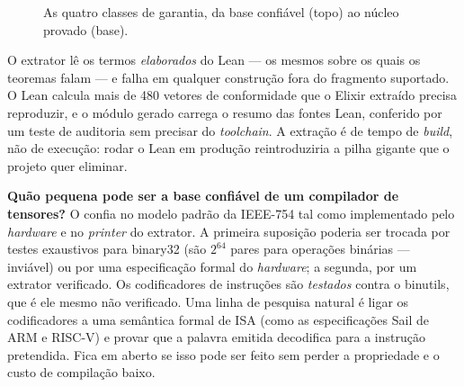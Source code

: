 \begin{figure}[htbp]
\centering
{}
\caption{As quatro classes de garantia, da base confiável (topo) ao núcleo provado (base).}
\label{fig:garantias}
\end{figure}

O extrator lê os termos \emph{elaborados} do Lean --- os mesmos sobre os quais os teoremas falam --- e falha em qualquer construção fora do fragmento suportado. O Lean calcula mais de 480 vetores de conformidade que o Elixir extraído precisa reproduzir, e o módulo gerado carrega o resumo das fontes Lean, conferido por um teste de auditoria sem precisar do \textit{toolchain}. A extração é de tempo de \textit{build}, não de execução: rodar o Lean em produção reintroduziria a pilha gigante que o projeto quer eliminar.

\begin{doutorado}
\textbf{Quão pequena pode ser a base confiável de um compilador de tensores?} O \vapor{} confia no modelo padrão da IEEE-754 tal como implementado pelo \textit{hardware} e no \textit{printer} do extrator. A primeira suposição poderia ser trocada por testes exaustivos para binary32 (são $2^{64}$ pares para operações binárias --- inviável) ou por uma especificação formal do \textit{hardware}; a segunda, por um extrator verificado. Os codificadores de instruções são \emph{testados} contra o binutils, que é ele mesmo não verificado. Uma linha de pesquisa natural é ligar os codificadores a uma semântica formal de ISA (como as especificações Sail de ARM e RISC-V) e provar que a palavra emitida decodifica para a instrução pretendida. Fica em aberto se isso pode ser feito sem perder a propriedade  e o custo de compilação baixo.
\end{doutorado}

